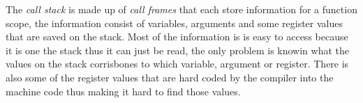  


The \emph{call stack} is made up of \emph{call frames} that each store information for a function scope, the information consist of variables, arguments and some register values that are saved on the stack.
Most of the information is is easy to access because it is one the stack thus it can just be read, the only problem is knowin what the values on the stack corrisbones to which variable, argument or register.
There is also some of the register values that are hard coded by the compiler into the machine code thus making it hard to find those values.

